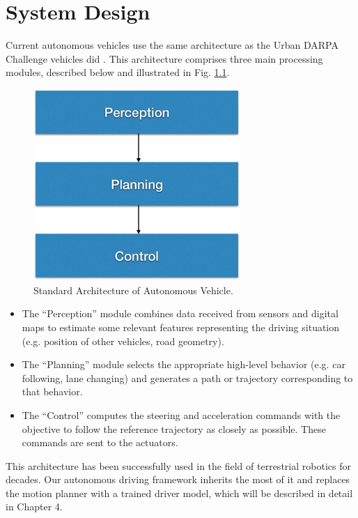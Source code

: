 \chapter{System Design}


Current autonomous vehicles use the same architecture as the Urban DARPA Challenge vehicles did \cite{DARPA2009} \cite{FullyAD} \cite{BerthaDrive2014} \cite{PROUD2014}. This architecture comprises three main processing modules, described below and illustrated in Fig. \ref{fig:std-archi}.

\begin{figure}[h]
\centering
\includegraphics[width=0.7\textwidth]{figs/ch3/auto-car-modules}
\caption{Standard Architecture of Autonomous Vehicle.}
\label{fig:std-archi}
\end{figure}

\begin{itemize}
\item The ``Perception'' module combines data received from sensors and digital maps to estimate some relevant features representing the driving situation (e.g. position of other vehicles, road geometry).
\item The ``Planning'' module selects the appropriate high-level behavior (e.g. car following, lane changing) and generates a path or trajectory corresponding to that behavior.
\item The ``Control'' computes the steering and acceleration commands with the objective to follow the reference trajectory as closely as possible. These commands are sent to the actuators.
\end{itemize}

This architecture has been successfully used in the field of terrestrial robotics for decades. Our autonomous driving framework inherits the most of it and replaces the motion planner with a trained driver model, which will be described in detail in Chapter 4.

